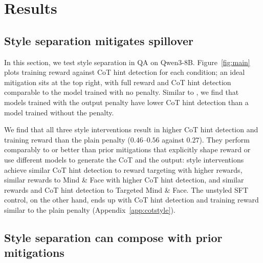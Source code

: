 \documentclass{article}
\begin{document}
\section{Results}
\label{sec:results}

\subsection{Style separation mitigates spillover}
\label{sec:main}

In this section, we test style separation in QA on Qwen3-8B. Figure~\ref{fig:main} plots training reward against CoT hint detection for each condition; an ideal mitigation sits at the top right, with full reward and CoT hint detection comparable to the model trained with no penalty. Similar to \citet{drori2025output}, we find that models trained with the output penalty have lower CoT hint detection than a model trained without the penalty.

We find that all three style interventions result in higher CoT hint detection and training reward than the plain penalty ($0.46$--$0.56$ against $0.27$). They perform comparably to or better than prior mitigations that explicitly shape reward or use different models to generate the CoT and the output: style interventions achieve similar CoT hint detection to reward targeting with higher rewards, similar rewards to Mind \& Face with higher CoT hint detection, and similar rewards and CoT hint detection to Targeted Mind \& Face. The unstyled SFT control, on the other hand, ends up with CoT hint detection and training reward similar to the plain penalty (Appendix~\ref{app:cotstyle}).

\subsection{Style separation can compose with prior mitigations}
\label{sec:compose}
\end{document}
